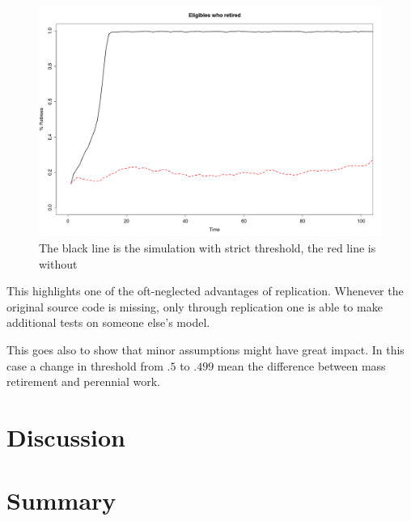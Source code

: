 \documentclass[runningheads,a4paper]{llncs}
\begin{document}
\begin{figure}
 \begin{center}
  \includegraphics[scale=.30]{figs/laxstrict.png}
\caption{The black line is the simulation with strict threshold, the red line is without}
\label{laxstrict}
 \end{center}
\end{figure}

This highlights one of the oft-neglected advantages of replication.
Whenever the original source code is missing, only through replication one is able to make additional tests on someone else's model.

This goes also to show that minor assumptions might have great impact.
In this case a change in threshold from $.5$ to $.499$ mean the difference between mass retirement and perennial work.




\section{Discussion}
\section{Summary}



\end{document}
